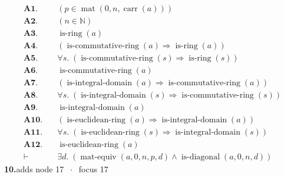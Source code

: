 \documentclass[11pt]{article}
\theoremstyle{plain}
\newcommand{\fit}[1]{\resizebox{\ifdim\width>\linewidth\linewidth\else\width\fi}{!}{#1}}
\begin{document}
\begin{align*}
  \mathbf{A1.}\quad & (p \in \operatorname{mat}(0, n, \operatorname{carr}(a))) \\
  \mathbf{A2.}\quad & (n \in \mathbb{N}) \\
  \mathbf{A3.}\quad & \operatorname{is\text{-}ring}(a) \\
  \mathbf{A4.}\quad & (\operatorname{is\text{-}commutative\text{-}ring}(a) \Rightarrow \operatorname{is\text{-}ring}(a)) \\
  \mathbf{A5.}\quad & \forall s.\; (\operatorname{is\text{-}commutative\text{-}ring}(s) \Rightarrow \operatorname{is\text{-}ring}(s)) \\
  \mathbf{A6.}\quad & \operatorname{is\text{-}commutative\text{-}ring}(a) \\
  \mathbf{A7.}\quad & (\operatorname{is\text{-}integral\text{-}domain}(a) \Rightarrow \operatorname{is\text{-}commutative\text{-}ring}(a)) \\
  \mathbf{A8.}\quad & \forall s.\; (\operatorname{is\text{-}integral\text{-}domain}(s) \Rightarrow \operatorname{is\text{-}commutative\text{-}ring}(s)) \\
  \mathbf{A9.}\quad & \operatorname{is\text{-}integral\text{-}domain}(a) \\
  \mathbf{A10.}\quad & (\operatorname{is\text{-}euclidean\text{-}ring}(a) \Rightarrow \operatorname{is\text{-}integral\text{-}domain}(a)) \\
  \mathbf{A11.}\quad & \forall s.\; (\operatorname{is\text{-}euclidean\text{-}ring}(s) \Rightarrow \operatorname{is\text{-}integral\text{-}domain}(s)) \\
  \mathbf{A12.}\quad & \operatorname{is\text{-}euclidean\text{-}ring}(a) \\
  \vdash\quad & \exists d.\; (\operatorname{mat\text{-}equiv}(a, 0, n, p, d) \wedge \operatorname{is\text{-}diagonal}(a, 0, n, d))
\end{align*}
\medskip\noindent\textbf{10.}\quad \fit{\texttt{(ew 'p)}}\hfill{\small adds node 17 $\;\cdot\;$ focus 17}\\[2pt]
\end{document}
